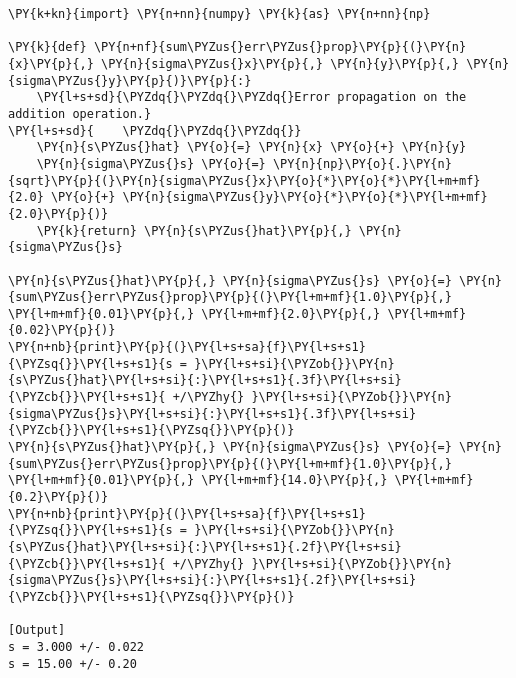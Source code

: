 \begin{Verbatim}[label=\makebox{\href{https://bitbucket.org/lbaldini/statnotes/src/master/snippets/func\_def.py}{https://bitbucket.org/.../func\_def.py}},commandchars=\\\{\}]
\PY{k+kn}{import} \PY{n+nn}{numpy} \PY{k}{as} \PY{n+nn}{np}

\PY{k}{def} \PY{n+nf}{sum\PYZus{}err\PYZus{}prop}\PY{p}{(}\PY{n}{x}\PY{p}{,} \PY{n}{sigma\PYZus{}x}\PY{p}{,} \PY{n}{y}\PY{p}{,} \PY{n}{sigma\PYZus{}y}\PY{p}{)}\PY{p}{:}
    \PY{l+s+sd}{\PYZdq{}\PYZdq{}\PYZdq{}Error propagation on the addition operation.}
\PY{l+s+sd}{    \PYZdq{}\PYZdq{}\PYZdq{}}
    \PY{n}{s\PYZus{}hat} \PY{o}{=} \PY{n}{x} \PY{o}{+} \PY{n}{y}
    \PY{n}{sigma\PYZus{}s} \PY{o}{=} \PY{n}{np}\PY{o}{.}\PY{n}{sqrt}\PY{p}{(}\PY{n}{sigma\PYZus{}x}\PY{o}{*}\PY{o}{*}\PY{l+m+mf}{2.0} \PY{o}{+} \PY{n}{sigma\PYZus{}y}\PY{o}{*}\PY{o}{*}\PY{l+m+mf}{2.0}\PY{p}{)}
    \PY{k}{return} \PY{n}{s\PYZus{}hat}\PY{p}{,} \PY{n}{sigma\PYZus{}s}

\PY{n}{s\PYZus{}hat}\PY{p}{,} \PY{n}{sigma\PYZus{}s} \PY{o}{=} \PY{n}{sum\PYZus{}err\PYZus{}prop}\PY{p}{(}\PY{l+m+mf}{1.0}\PY{p}{,} \PY{l+m+mf}{0.01}\PY{p}{,} \PY{l+m+mf}{2.0}\PY{p}{,} \PY{l+m+mf}{0.02}\PY{p}{)}
\PY{n+nb}{print}\PY{p}{(}\PY{l+s+sa}{f}\PY{l+s+s1}{\PYZsq{}}\PY{l+s+s1}{s = }\PY{l+s+si}{\PYZob{}}\PY{n}{s\PYZus{}hat}\PY{l+s+si}{:}\PY{l+s+s1}{.3f}\PY{l+s+si}{\PYZcb{}}\PY{l+s+s1}{ +/\PYZhy{} }\PY{l+s+si}{\PYZob{}}\PY{n}{sigma\PYZus{}s}\PY{l+s+si}{:}\PY{l+s+s1}{.3f}\PY{l+s+si}{\PYZcb{}}\PY{l+s+s1}{\PYZsq{}}\PY{p}{)}
\PY{n}{s\PYZus{}hat}\PY{p}{,} \PY{n}{sigma\PYZus{}s} \PY{o}{=} \PY{n}{sum\PYZus{}err\PYZus{}prop}\PY{p}{(}\PY{l+m+mf}{1.0}\PY{p}{,} \PY{l+m+mf}{0.01}\PY{p}{,} \PY{l+m+mf}{14.0}\PY{p}{,} \PY{l+m+mf}{0.2}\PY{p}{)}
\PY{n+nb}{print}\PY{p}{(}\PY{l+s+sa}{f}\PY{l+s+s1}{\PYZsq{}}\PY{l+s+s1}{s = }\PY{l+s+si}{\PYZob{}}\PY{n}{s\PYZus{}hat}\PY{l+s+si}{:}\PY{l+s+s1}{.2f}\PY{l+s+si}{\PYZcb{}}\PY{l+s+s1}{ +/\PYZhy{} }\PY{l+s+si}{\PYZob{}}\PY{n}{sigma\PYZus{}s}\PY{l+s+si}{:}\PY{l+s+s1}{.2f}\PY{l+s+si}{\PYZcb{}}\PY{l+s+s1}{\PYZsq{}}\PY{p}{)}

[Output]
s = 3.000 +/- 0.022
s = 15.00 +/- 0.20
\end{Verbatim}